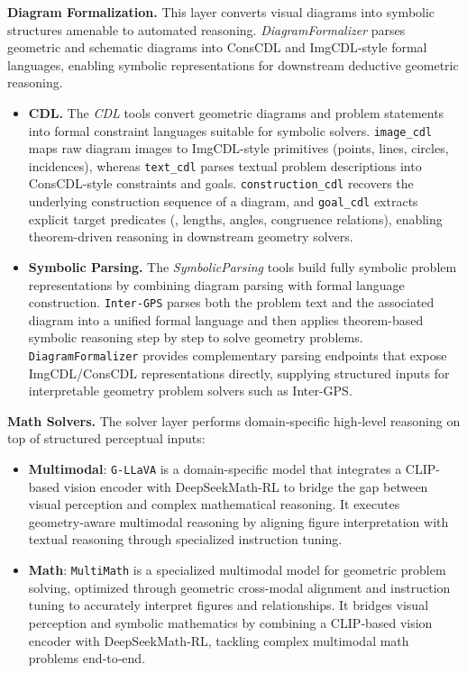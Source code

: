 \noindent \textbf{Diagram Formalization.}
This layer converts visual diagrams into symbolic structures amenable to automated reasoning. \emph{DiagramFormalizer} parses geometric and schematic diagrams into ConsCDL and ImgCDL‑style formal languages, enabling symbolic representations for downstream deductive geometric reasoning.
\begin{itemize}
    \item \textbf{CDL.}
The \emph{CDL} tools convert geometric diagrams and problem statements into formal constraint languages suitable for symbolic solvers. 
\texttt{image\_cdl} maps raw diagram images to ImgCDL-style primitives (points, lines, circles, incidences), whereas \texttt{text\_cdl} parses textual problem descriptions into ConsCDL-style constraints and goals. 
\texttt{construction\_cdl} recovers the underlying construction sequence of a diagram, and \texttt{goal\_cdl} extracts explicit target predicates (\eg, lengths, angles, congruence relations), enabling theorem-driven reasoning in downstream geometry solvers.  
    \item \textbf{Symbolic Parsing.}
The \emph{SymbolicParsing} tools build fully symbolic problem representations by combining diagram parsing with formal language construction. 
\texttt{Inter-GPS} parses both the problem text and the associated diagram into a unified formal language and then applies theorem-based symbolic reasoning step by step to solve geometry problems. 
\texttt{DiagramFormalizer} provides complementary parsing endpoints that expose ImgCDL/ConsCDL representations directly, supplying structured inputs for interpretable geometry problem solvers such as Inter-GPS.  
\end{itemize}

\noindent \textbf{Math Solvers.}
The solver layer performs domain‑specific high‑level reasoning on top of structured perceptual inputs:
\begin{itemize}
    \item \textbf{Multimodal}: \texttt{G‑LLaVA} is a domain-specific model that integrates a CLIP-based vision encoder with DeepSeekMath-RL to bridge the gap between visual perception and complex mathematical reasoning. It executes geometry‑aware multimodal reasoning by aligning figure interpretation with textual reasoning through specialized instruction tuning.
    \item \textbf{Math}: \texttt{MultiMath} is a specialized multimodal model for geometric problem solving, optimized through geometric cross-modal alignment and instruction tuning to accurately interpret figures and relationships. It bridges visual perception and symbolic mathematics by combining a CLIP‑based vision encoder with DeepSeekMath‑RL, tackling complex multimodal math problems end‑to‑end.
\end{itemize}

